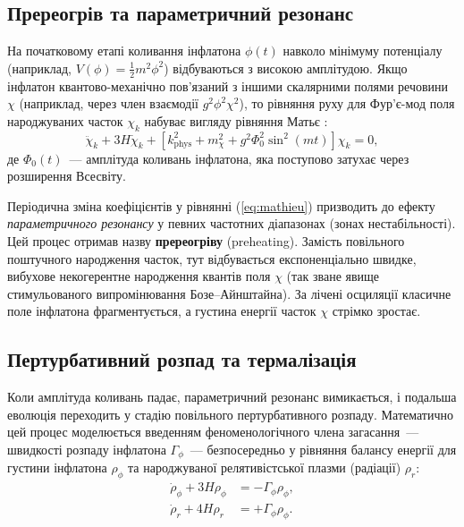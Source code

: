 \documentclass[12pt, a4paper]{article}
\begin{document}
\subsection{Пререогрів та параметричний резонанс}

На початковому етапі коливання інфлатона $\phi(t)$ навколо мінімуму потенціалу (наприклад, $V(\phi) = \frac{1}{2}m^2\phi^2$) відбуваються з високою амплітудою. Якщо інфлатон квантово-механічно пов'язаний з іншими скалярними полями речовини $\chi$ (наприклад, через член взаємодії $g^2\phi^2\chi^2$), то рівняння руху для Фур'є-мод поля народжуваних часток $\chi_k$ набуває вигляду рівняння Матьє \cite{kofman_1994, kofman_1997}:
\begin{equation}\label{eq:mathieu}
  \ddot{\chi}_k + 3H\dot{\chi}_k + \left[ k_{\mathrm{phys}}^2 + m_\chi^2 + g^2\Phi_0^2\sin^2(mt) \right]\chi_k = 0,
\end{equation}
де $\Phi_0(t)$~--- амплітуда коливань інфлатона, яка поступово затухає через розширення Всесвіту.

Періодична зміна коефіцієнтів у рівнянні (\ref{eq:mathieu}) призводить до ефекту \emph{параметричного резонансу} у певних частотних діапазонах (зонах нестабільності). Цей процес отримав назву \textbf{пререогріву} (preheating). Замість повільного поштучного народження часток, тут відбувається експоненціально швидке, вибухове некогерентне народження квантів поля $\chi$ (так зване явище стимульованого випромінювання Бозе--Айнштайна). За лічені осциляції класичне поле інфлатона фрагментується, а густина енергії часток $\chi$ стрімко зростає.

\subsection{Пертурбативний розпад та термалізація}

Коли амплітуда коливань падає, параметричний резонанс вимикається, і подальша еволюція переходить у стадію повільного пертурбативного розпаду. Математично цей процес моделюється введенням феноменологічного члена загасання~--- швидкості розпаду інфлатона $\Gamma_\phi$~--- безпосередньо у рівняння балансу енергії для густини інфлатона $\rho_\phi$ та народжуваної релятивістської плазми (радіації) $\rho_r$:
\begin{align}
  \dot{\rho}_\phi + 3H\rho_\phi &= -\Gamma_\phi \rho_\phi, \label{eq:reheat_rho_phi} \\
  \dot{\rho}_r + 4H\rho_r &= +\Gamma_\phi \rho_\phi. \label{eq:reheat_rho_r}
\end{align}
\end{document}
